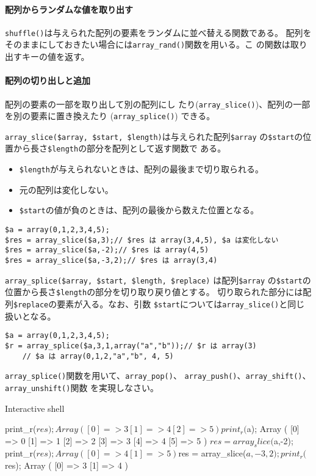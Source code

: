 \paragraph{配列からランダムな値を取り出す}
\Verb+shuffle()+は与えられた配列の要素をランダムに並べ替える関数である。
配列をそのままにしておきたい場合には\Verb+array_rand()+関数を用いる。こ
の関数は取り出すキーの値を返す。

\paragraph{配列の切り出しと追加}配列の要素の一部を取り出して別の配列にし
たり(\Verb+array_slice()+)、配列の一部を別の要素に置き換えたり
(\Verb+array_splice()+) できる。

\Verb+array_slice($array, $start, $length)+は与えられた配列\Verb+$array+
の\Verb+$start+の位置から長さ\Verb+$length+の部分を配列として返す関数で
ある。
\begin{itemize}
 \item \Verb+$length+が与えられないときは、配列の最後まで切り取られる。 
 \item 元の配列は変化しない。
 \item \Verb+$start+の値が負のときは、配列の最後から数えた位置となる。
\end{itemize}
\begin{Verbatim}
$a = array(0,1,2,3,4,5);
$res = array_slice($a,3);// $res は array(3,4,5), $a は変化しない
$res = array_slice($a,-2);// $res は array(4,5)
$res = array_slice($a,-3,2);// $res は array(3,4)
\end{Verbatim}
\Verb+array_splice($array, $start, $length, $replace)+ は配列\Verb+$array+
の\Verb+$start+の位置から長さ\Verb+$length+の部分を切り取り戻り値とする。
切り取られた部分には配列\Verb+$replace+の要素が入る。なお、引数
\Verb+$start+については\Verb+array_slice()+と同じ扱いとなる。
\begin{Verbatim}
$a = array(0,1,2,3,4,5);
$r = array_splice($a,3,1,array("a","b"));// $r は array(3)
	// $a は array(0,1,2,"a","b", 4, 5)
\end{Verbatim}
\begin{Prob}
\Verb+array_splice()+関数を用いて、\Verb+array_pop()+、
 \Verb+array_push()+、\Verb+array_shift()+、\\\Verb+array_unshift()+関数
 を実現しなさい。 
\end{Prob}
\iffalse
Interactive shell

print_r($res);
Array
(
    [0] => 3
    [1] => 4
    [2] => 5
)
print_r($a);
Array
(
    [0] => 0
    [1] => 1
    [2] => 2
    [3] => 3
    [4] => 4
    [5] => 5
)
$res = array_slice($a,-2);
print_r($res);
Array
(
    [0] => 4
    [1] => 5
)
$res = array_slice($a,-3,2);
print_r($res);
Array
(
    [0] => 3
    [1] => 4
)

